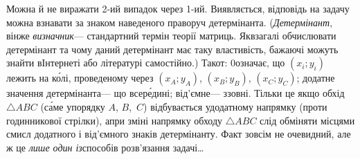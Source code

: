 Можна й не виражати \mbox{2-ий} випадок через \mbox{1-ий}. Виявляється, відповідь на задачу можна взнавати за знаком наведеного праворуч детермінанта. (\emph{Детермінант}, він\nolinebreak[3] же \emph{визначник}\nolinebreak[3] --- стандартний термін теорії матриць. Як\nolinebreak[3] взагалі обчислювати детермінант та чому даний детермінант має таку властивість, бажаючі можуть знайти в\nolinebreak[3] Інтернеті або літературі самостійно.) Так\nolinebreak[3] от: 0\nolinebreak[3] означає, що ${(x_i;y_i)}$ лежить на к\'{о}лі, проведеному через ${(x_A;y_A)}$, ${(x_B;y_B)}$, ${(x_C;y_C)}$; додатне значення детермінанта\nolinebreak[3] --- що всер\'{е}дині; від'ємне\nolinebreak[3] --- ззовні. Тільки це якщо обхід $\triangle{}ABC$ (с\'{а}ме у\nolinebreak[3] порядку $A$, $B$,~$C$) відбувається у\nolinebreak[3] додатному напрямку (проти годинникової стрілки), а\nolinebreak[3] при зміні напрямку обходу $\triangle{}ABC$ слід обміняти місцями смисл додатного і від'ємного знаків детермінанту. Факт зовсім не очевидний, але ж це \emph{лише один із}\nolinebreak[3] способів розв'язання задачі\dots

